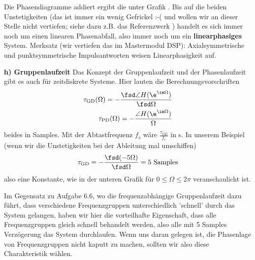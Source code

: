 Die Phasendiagramme addiert ergibt die unter Grafik
. Bis auf die beiden Unstetigkeiten
(das ist immer ein wenig Gefrickel :-( und wollen wir an dieser
Stelle nicht vertiefen; siehe dazu z.B. das Referenzwerk
\cite{Oppenheim2010, Oppenheim2004})
handelt es sich immer noch um einen linearen Phasenabfall, also immer
noch um ein \textbf{linearphasiges} System.
%
Merksatz (wir vertiefen das im Mastermodul DSP): Axialsymmetrische und
punktsymmetrische Impulsantworten weisen Linearphasigkeit auf.

\textbf{h) Gruppenlaufzeit}
Das Konzept der Gruppenlaufzeit und der Phasenlaufzeit
gibt es auch für zeitdiskrete Systeme.
Hier lauten die Berechnungsvorschriften
\begin{align}
\tau_\text{GD}(\Omega) = -\frac{\fsd \angle H(\e^{\im \Omega})}{\fsd \Omega}\\
\tau_\text{PD}(\Omega) = -\frac{\angle H(\e^{\im \Omega})}{\Omega}
\end{align}
beides in Samples. Mit der Abtastfrequenz $f_s$ wäre
$\frac{\tau_\text{GD}}{f_s}$ in s.
%
In unserem Beispiel (wenn wir die Unstetigkeiten bei der Ableitung mal umschiffen)
\begin{align}
\tau_\text{GD} = -\frac{\fsd (-5 \Omega)}{\fsd \Omega} = 5\text{ Samples}\\
\end{align}
also eine Konstante, wie in der unteren Grafik für $0\leq \Omega \leq 2 \pi$
veranschaulicht ist.
\begin{center}
\end{center}
%
Im Gegensatz zu Aufgabe 6.6, wo die frequenzabhängige Gruppenlaufzeit dazu führt,
dass verschiedene Frequenzgruppen unterschiedlich 'schnell' durch das System gelangen,
haben wir hier die vorteilhafte Eigenschaft, dass alle Frequenzgruppen
gleich schnell behandelt werden, also alle mit 5 Samples Verzögerung das
System durchlaufen.
Wenn uns daran gelegen ist, die Phasenlage von Frequenzgruppen nicht kaputt
zu machen, sollten wir also diese Charakteristik wählen.
%

